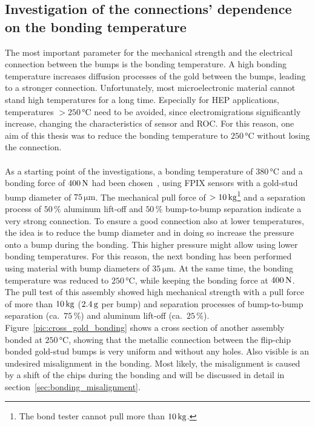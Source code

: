 \subsection{Investigation of the connections' dependence on the bonding temperature}\label{sec:flip-chip_bonding_temperature}
The most important parameter for the mechanical strength and the electrical connection between the bumps is the bonding temperature. A high bonding temperature increases diffusion processes of the gold between the bumps, leading to a stronger connection. Unfortunately, most microelectronic material cannot stand high temperatures for a long time. Especially for \ac{HEP} applications, temperatures $>250\,\si{\degreeCelsius}$ need to be avoided, since electromigrations significantly increase, changing the characteristics of sensor and \ac{ROC}. For this reason, one aim of this thesis was to reduce the bonding temperature to $250\,\si{\degreeCelsius}$ without losing the connection.
\\
\\As a starting point of the investigations, a bonding temperature of $380\,\si{\degreeCelsius}$ and a bonding force of $400\,\rm{N}$ had been chosen~\cite{Hei12}, using \ac{FPIX} sensors with a gold-stud bump diameter of $75\,\si{\micro \meter}$. The mechanical pull force of $>10\,\rm{kg}$\footnote{The bond tester cannot pull more than $10\,\rm{kg}$.} and a separation process of $50\,\%$ aluminum lift-off and $50\,\%$ bump-to-bump separation indicate a very strong connection. To ensure a good connection also at lower temperatures, the idea is to reduce the bump diameter and in doing so increase the pressure onto a bump during the bonding. This higher pressure might allow using lower bonding temperatures. For this reason, the next bonding has been performed using material with bump diameters of $35\,\si{\micro \meter}$. At the same time, the bonding temperature was reduced to $250\,\si{\degreeCelsius}$, while keeping the bonding force at $400\,\rm{N}$. The pull test of this assembly showed high mechanical strength with a pull force of more than $10\,\rm{kg}$ ($2.4\,\rm{g}$ per bump) and separation processes of bump-to-bump separation (ca.~$75\,\%$) and aluminum lift-off (ca.~$25\,\%$). Figure~\ref{pic:cross_gold_bonding} shows a cross section of another assembly bonded at $250\,\si{\degreeCelsius}$, showing that the metallic connection between the flip-chip bonded gold-stud bumps is very uniform and without any holes. Also visible is an undesired misalignment in the bonding. Most likely, the misalignment is caused by a shift of the chips during the bonding and will be discussed in detail in section~\ref{sec:bonding_misalignment}.
